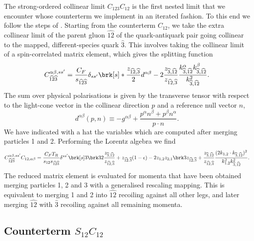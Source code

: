 \documentclass[11pt,a4paper]{article}
\newcommand{\eps}[0]{\epsilon}
\newcommand{\mpd}[1]{\widehat{#1}}
\begin{document}
The strong-ordered collinear limit $C_{123}C_{12}$ is the first nested limit
that we encounter whose counterterm we implement in an iterated fashion.
To this end we follow the steps of \cite{Somogyi:2006da}.
Starting from the counterterm $C_{12}$, we take the extra collinear limit
of the parent gluon $\mpd{12}$ of the quark-antiquark pair
going collinear to the mapped, different-species quark $\mpd{3}$.
This involves taking the collinear limit of a spin-correlated matrix element,
which gives the splitting function
\begin{equation}
	C_{\mpd{12}\mpd{3}}^{\alpha\beta,ss'} = \frac{C_F}{s_{\mpd{12}\mpd{3}}}
	\delta_{ss'} \brk[s]*{
		\frac{z_{\mpd{12},\mpd{3}}}{2} d^{\alpha\beta}
		- 2 \frac{z_{\mpd{3},\mpd{12}}}{z_{\mpd{12},\mpd{3}}}
		\frac{k_{\mpd{3},\mpd{12}}^\alpha k_{\mpd{3},\mpd{12}}^\beta}
		{k_{\mpd{3},\mpd{12}}^2}
	}.
\end{equation}
The sum over physical polarisations is given by the transverse tensor
with respect to the light-cone vector in the collinear direction $p$
and a reference null vector $n$,
\begin{equation}
	d^{\alpha\beta}(p, n) \equiv
	-g^{\alpha\beta}
	+ \frac{p^\alpha n^\beta + p^\beta n^\alpha}{p \cdot n}.
\end{equation}
We have indicated with a hat the variables which are computed
after merging particles 1 and 2.
Performing the Lorentz algebra we find
\begin{equation}
\label{eq:iterC123C12qq}
	C_{\mpd{12}\mpd{3}}^{\alpha\beta,ss'} C_{12,\alpha\beta}
	= \frac{C_FT_R}{s_{12}s_{\mpd{12}\mpd{3}}} \delta^{ss'} \brk[s]3{
		\brk3{
			2 \frac{z_{\mpd{3},\mpd{12}}}{z_{\mpd{12},\mpd{3}}}+
			z_{\mpd{12},\mpd{3}} (1 - \eps)
		} - 2 z_{1,2} z_{2,1} \brk3{
			z_{\mpd{12},\mpd{3}} +
			\frac{z_{\mpd{3},\mpd{12}}}{z_{\mpd{12},\mpd{3}}}
			\frac{(2k_{1,2}\cdot k_{\mpd{3},\mpd{12}})^2}
			{k_{1,2}^2 k_{\mpd{3},\mpd{12}}^2}
		}
	}.
\end{equation}
The reduced matrix element is evaluated for momenta that have been obtained
merging particles 1, 2 and 3 with a generalised rescaling mapping.
This is equivalent to merging 1 and 2 into $\mpd{12}$
recoiling against all other legs,
and later merging $\mpd{12}$ with $\mpd{3}$
recoiling against all remaining momenta.


\subsection{Counterterm $S_{12}C_{12}$}
\end{document}
